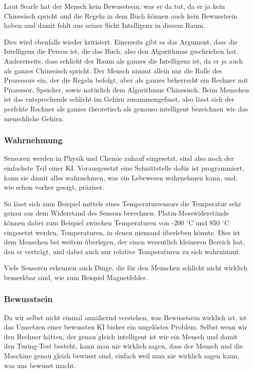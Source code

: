 Laut Searle hat der Mensch kein Bewusstsein, was er da tut, da er ja kein Chinesisch spricht und die Regeln in dem Buch können auch kein Bewusstsein haben und damit fehlt aus seiner Sicht Intelligenz in diesem Raum.

Dies wird ebenfalls wieder kritisiert.
Einerseits gibt es das Argument, dass die Intelligenz die Person ist, die das Buch, also den Algorithmus geschrieben hat.
Andererseits, dass schlicht der Raum als ganzes die Intelligenz ist, da er ja auch als ganzes Chinesisch spricht.
Der Mensch nimmt allein nur die Rolle des Prozessors ein, der die Regeln befolgt, aber als ganzes beherrscht ein Rechner mit Prozessor, Speicher, sowie natürlich dem Algorithmus Chinesisch.
Beim Menschen ist das entsprechende schlicht im Gehirn zusammengefasst, also lässt sich der perfekte Rechner als ganzes theoretisch als genauso intelligent bezeichnen wie das menschliche Gehirn.

\subsubsection{Wahrnehmung}
Sensoren werden in Physik und Chemie zuhauf eingesetzt, sind also noch der einfachste Teil einer KI.
Vorausgesetzt eine Schnittstelle dafür ist programmiert, kann sie damit alles wahrnehmen, was ein Lebewesen wahrnehmen kann, und, wie schon vorher gesagt, präziser.

So lässt sich zum Beispiel mittels eines Temperatursensors die Temperatur sehr genau aus dem Widerstand des Sensors berechnen.
Platin-Messwiderstände können dabei zum Beispiel zwischen Temperaturen von -200 $^\circ$C und 850 $^\circ$C eingesetzt werden, Temperaturen, in denen niemand überleben könnte.
Dies ist dem Menschen bei weitem überlegen, der einen wesentlich kleineren Bereich hat, den er verträgt, und dabei auch nur relative Temperaturen zu sich wahrnimmt.

Viele Sensoren erkennen auch Dinge, die für den Menschen schlicht nicht wirklich bemerkbar sind, wie zum Beispiel Magnetfelder.

\subsubsection{Bewusstsein}
Da wir selbst nicht einmal annähernd verstehen, was Bewusstsein wirklich ist, ist das Umsetzen einer bewussten KI bisher ein ungelöstes Problem.
Selbst wenn wir den Rechner hätten, der genau gleich intelligent ist wie ein Mensch und damit den Turing-Test besteht, kann man nie wirklich sagen, dass der Mensch und die Maschine genau gleich bewusst sind, einfach weil man nie wirklich sagen kann, was uns bewusst macht.

